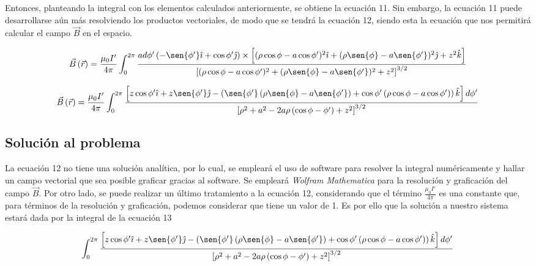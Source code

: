 \documentclass{article}
\begin{document}
\begin{multicols}{2}
Entonces, planteando la integral con los elementos calculados anteriormente, se obtiene la ecuación 11. Sin embargo, la ecuación 11 puede desarrollarse aún más resolviendo los productos vectoriales, de modo que se tendrá la ecuación 12, siendo esta la ecuación que nos permitirá calcular el campo $\vec{B}$ en el espacio.
\end{multicols}

\begin{equation}
    \vec{B}\left(\vec{r}\right) = \frac{\mu_0 I'}{4\pi} \int_{0}^{2\pi} \frac{
        ad\phi'\left(-\sen{\phi'} \hat{\imath} + \cos{\phi'} \hat{\jmath}\right)
        \times
        \left[(\rho\cos{\phi} - a\cos{\phi'})^2 \hat{\imath} + (\rho\sen{\phi} - a\sen{\phi'})^2 \hat{\jmath} + z^2 \hat{k}\right]
    }{
        \left[(\rho\cos{\phi} - a\cos{\phi'})^2 + (\rho\sen{\phi} - a\sen{\phi'})^2 + z^2\right]^{3/2}
    }
\end{equation}

\begin{equation}
    \vec{B}\left(\vec{r}\right) = \frac{\mu_0 I'}{4\pi} \int_{0}^{2\pi} \frac{
        \left[z\cos{\phi'}\hat{\imath}
            + z\sen{\phi'}\hat{\jmath}
            - \left(
            \sen{\phi'}\left(\rho\sen{\phi} - a\sen{\phi'}\right)
            + \cos{\phi'}\left(\rho\cos{\phi} - a\cos{\phi'}\right)
            \right)\hat{k}\right]
        d\phi'
    }{
        \left[\rho^2 + a^2 - 2a\rho\left(\cos{\phi - \phi'}\right) + z^2\right]^{3/2}
    }
\end{equation}

\begin{multicols}{2}
\section{Solución al problema}
La ecuación 12 no tiene una solución analítica, por lo cual, se empleará el uso de software para resolver la integral numéricamente y hallar un campo vectorial que sea posible graficar gracias al software.
Se empleará \emph{Wolfram Mathematica} para la resolución y graficación del campo $\vec{B}$. Por otro lado, se puede realizar un último tratamiento a la ecuación 12, considerando que el término $\frac{\mu_0 I'}{4\pi}$ es una constante que, para términos de la resolución y graficación, podemos considerar que tiene un valor de 1. Es por ello que la solución a nuestro sistema estará dada por la integral de la ecuación 13
\end{multicols}

\begin{equation}
    \int_{0}^{2\pi} \frac{
        \left[z\cos{\phi'}\hat{\imath}
            + z\sen{\phi'}\hat{\jmath}
            - \left(
            \sen{\phi'}\left(\rho\sen{\phi} - a\sen{\phi'}\right)
            + \cos{\phi'}\left(\rho\cos{\phi} - a\cos{\phi'}\right)
            \right)\hat{k}\right]
        d\phi'
    }{
        \left[\rho^2 + a^2 - 2a\rho\left(\cos{\phi - \phi'}\right) + z^2\right]^{3/2}
    }
\end{equation}
\end{document}
